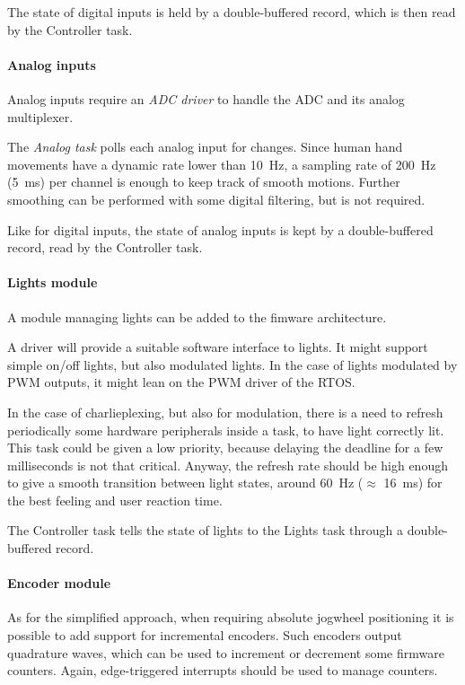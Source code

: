 \documentclass[a4paper,10pt]{article}
\begin{document}
\begin{multicols}{2}
The state of digital inputs is held by a double-buffered record, which is then
read by the Controller task.


\paragraph{Analog inputs}
Analog inputs require an \emph{ADC driver} to handle the ADC and its analog
multiplexer.

The \emph{Analog task} polls each analog input for changes. Since human hand
movements have a dynamic rate lower than 10~Hz, a sampling rate of 200~Hz
(5~ms) per channel is enough to keep track of smooth motions. Further
smoothing can be performed with some digital filtering, but is not required.

Like for digital inputs, the state of analog inputs is kept by a
double-buffered record, read by the Controller task.


\paragraph{Lights module}
A module managing lights can be added to the fimware architecture.

A driver will provide a suitable software interface to lights. It might
support simple on/off lights, but also modulated lights. In the case of lights
modulated by PWM outputs, it might lean on the PWM driver of the RTOS.

In the case of charlieplexing, but also for modulation, there is a need to
refresh periodically some hardware peripherals inside a task, to have light
correctly lit. This task could be given a low priority, because delaying the
deadline for a few milliseconds is not that critical. Anyway, the refresh rate
should be high enough to give a smooth transition between light states, around
60~Hz ($\approx$ 16~ms) for the best feeling and user reaction time.

The Controller task tells the state of lights to the Lights task through a
double-buffered record.


\paragraph{Encoder module}
As for the simplified approach, when requiring absolute jogwheel positioning
it is possible to add support for incremental encoders. Such encoders output
quadrature waves, which can be used to increment or decrement some firmware
counters. Again, edge-triggered interrupts should be used to manage counters.


\end{multicols}
\end{document}
